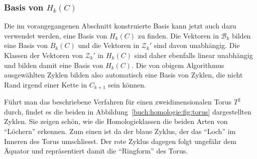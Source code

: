 \subsubsection{Basis von $H_k(C)$}
Die im vorangegangenen Abschnitt konstruierte Basis kann jetzt auch
dazu verwendet werden, eine Basis von $H_k(C)$ zu finden.
Die Vektoren in $\mathcal{B}_k$ bilden eine Basis von $B_k(C)$
und die Vektoren in $\mathcal{Z}_k'$ sind davon unabhängig.
Die Klassen der Vektoren von $\mathcal{Z}_k'$ in $H_k(C)$ sind
daher ebenfalls linear unabhängig und bilden damit eine Basis
von $H_k(C)$.
Die von obigem Algorithmus ausgewählten Zyklen bilden also automatisch
eine Basis von Zyklen, die nicht Rand irgend einer Kette in $C_{k+1}$
sein können.


Führt man das beschriebene Verfahren für einen zweidimensionalen Torus $T^2$ durch,
findet es die beiden in Abbildung~\ref{buch:homologie:fig:torus} dargestellten
Zyklen.
Sie zeigen schön, wie die Homologieklassen die beiden Arten von ``Löchern''
erkennen.
Zum einen ist da der blaue Zyklus, der das ``Loch'' im Inneren des Torus
umschliesst.
Der rote Zyklus dagegen folgt ungefähr dem Äquator und repräsentiert
damit die ``Ringform'' des Torus.
